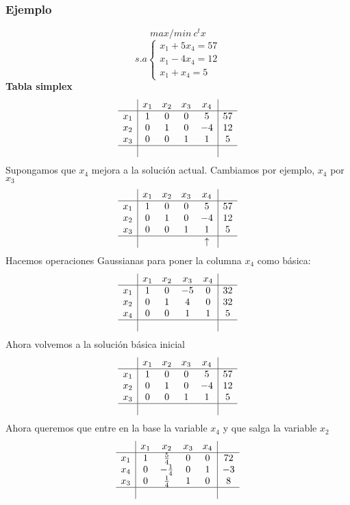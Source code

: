 \documentclass[11pt,fleqn]{book} %
\begin{document}
\subsubsection{Ejemplo}
$$ max/min ~c^t x$$
$$s.a \left\{ \begin{array}{c}
  x_1+5x_4=57 \\
  x_1-4 x_4=12 \\
  x_1+x_4 = 5
\end{array}\right.$$
\textbf{Tabla simplex}
$$
\begin{array}{c|cccc|c}
  & x_1 & x_2 & x_3 & x_4 &  \\ \hline
  x_1 & 1 & 0 & 0 & 5 & 57 \\
  x_2 & 0 & 1 & 0 & -4 & 12 \\
  x_3 & 0 & 0 & 1 & 1 & 5 \\ \hline
  & & & & &
\end{array}
$$
Supongamos que $x_4$ mejora a la solución actual. Cambiamos por ejemplo, $x_4$ por $x_3$
$$
\begin{array}{c|cccc|c}
  & x_1 & x_2 & x_3 & x_4 &  \\ \hline
  x_1 & 1 & 0 & 0 & 5 & 57 \\
  x_2 & 0 & 1 & 0 & -4 & 12 \\
  x_3 & 0 & 0 & 1 & 1 & 5 \\ \hline
  & & & & \uparrow &
\end{array}
$$
Hacemos operaciones Gaussianas para poner la columna $x_4$ como básica:
$$
\begin{array}{c|cccc|c}
  & x_1 & x_2 & x_3 & x_4 &  \\ \hline
  x_1 & 1 & 0 & -5 & 0 & 32 \\
  x_2 & 0 & 1 & 4 & 0 & 32 \\
  x_4 & 0 & 0 & 1 & 1 & 5 \\ \hline
  & & & &  &
\end{array}
$$
Ahora volvemos a la solución básica inicial
$$
\begin{array}{c|cccc|c}
  & x_1 & x_2 & x_3 & x_4 &  \\ \hline
  x_1 & 1 & 0 & 0 & 5 & 57 \\
  x_2 & 0 & 1 & 0 & -4 & 12 \\
  x_3 & 0 & 0 & 1 & 1 & 5 \\ \hline
  & & & & &
\end{array}
$$
Ahora queremos que entre en la base la variable $x_4$ y que salga la variable $x_2$
$$
\begin{array}{c|cccc|c}
  & x_1 & x_2 & x_3 & x_4 &  \\ \hline
  x_1 & 1 & \frac{5}{4} & 0 & 0 & 72 \\
  x_4 & 0 & -\frac{1}{4} & 0 & 1 & -3 \\
  x_3 & 0 & \frac{1}{4} & 1 & 0 & 8 \\ \hline
  & & & & &
\end{array}
$$
\end{document}
